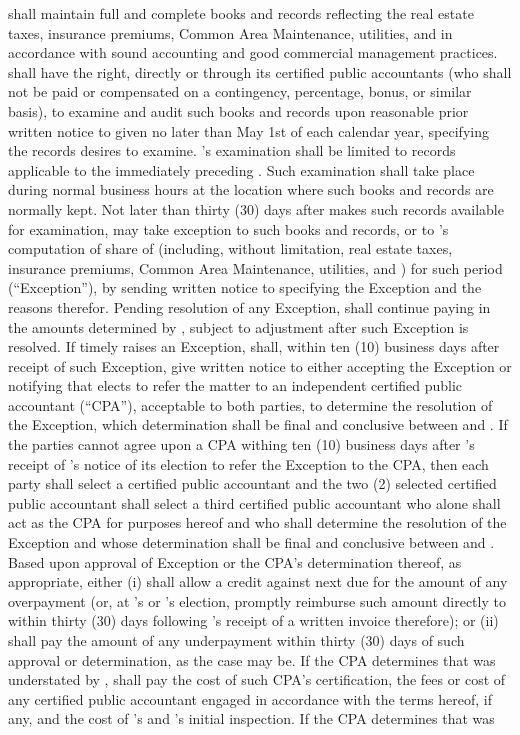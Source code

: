 \lessor shall maintain full and complete books and records reflecting the real estate taxes, insurance premiums, Common Area Maintenance, utilities, and \hvacMaintenance in accordance with sound accounting and good commercial management practices. \lessee shall have the right, directly or through its certified public accountants (who shall not be paid or compensated on a contingency, percentage, bonus, or similar basis), to examine and audit such books and records upon reasonable prior written notice to \lessor given no later than May 1st of each calendar year, specifying the records \lessee desires to examine. \lessee's examination shall be limited to records applicable to the immediately preceding \leaseYear. Such examination shall take place during normal business hours at the location where such books and records are normally kept. Not later than thirty (30) days after \lessor makes such records available for examination, \lessee may take exception to such books and records, or to \lessor's computation of \lesseesPercentage share of \additionalRent (including, without limitation, real estate taxes, insurance premiums, Common Area Maintenance, utilities, and \hvacMaintenance) for such period (``Exception''), by sending written notice to \lessor specifying the Exception and the reasons therefor. Pending resolution of any Exception, \lessee shall continue paying \additionalRent in the amounts determined by \lessor, subject to adjustment after such Exception is resolved. If \lessee timely raises an Exception, \lessor shall, within ten (10) business days after receipt of such Exception, give written notice to \lessee either accepting the Exception or notifying \lessee that \lessor elects to refer the matter to an independent certified public accountant (``CPA''), acceptable to both parties, to determine the resolution of the Exception, which determination shall be final and conclusive between \lessor and \lessee. If the parties cannot agree upon a CPA withing ten (10) business days after \lessee's receipt of \lessor's notice of its election to refer the Exception to the CPA, then each party shall select a certified public accountant and the two (2) selected certified public accountant shall select a third certified public accountant who alone shall act as the CPA for purposes hereof and who shall determine the resolution of the Exception and whose determination shall be final and conclusive between \lessor and \lessee. Based upon \lessor approval of Exception or the CPA's determination thereof, as appropriate, either (i) \lessor shall allow \lessee a credit against \monthlyRent next due for the amount of any overpayment (or, at \lessee's or \lessor's election, promptly reimburse such amount directly to \lessee within thirty (30) days following \lessor's receipt of a written invoice therefore); or (ii) \lessee shall pay \lessor the amount of any underpayment within thirty (30) days of such approval or determination, as the case may be. If the CPA determines that \additionalRent was understated by \lessor, \lessee shall pay the cost of such CPA's certification, the fees or cost of any certified public accountant engaged in accordance with the terms hereof, if any, and the cost of \lessee's and \lessor's initial inspection. If the CPA determines that \additionalRent was 